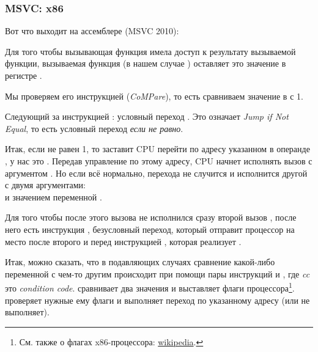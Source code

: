 \subsubsection{MSVC: x86}

Вот что выходит на ассемблере (MSVC 2010):



Для того чтобы вызывающая функция имела доступ к результату вызываемой функции, 
вызываемая функция (в нашем случае \scanf) оставляет это значение в регистре \EAX.

Мы проверяем его инструкцией  (\emph{CoMPare}), то есть сравниваем значение в \EAX с 1.

Следующий за инструкцией \CMP: условный переход \JNE. Это означает \emph{Jump if Not Equal}, то есть условный переход \emph{если не равно}.

Итак, если \EAX не равен 1, то \JNE заставит \ac{CPU} перейти по адресу указанном в операнде \JNE, у нас это .
Передав управление по этому адресу, \ac{CPU} начнет исполнять вызов \printf с аргументом .
Но если всё нормально, перехода не случится и исполнится другой \printf с двумя аргументами:\\
 и значением переменной .

Для того чтобы после этого вызова не исполнился сразу второй вызов \printf, 
после него есть инструкция \JMP, безусловный переход, который отправит процессор на место 
после второго \printf и перед инструкцией , которая реализует .

Итак, можно сказать, что в подавляющих случаях сравнение какой-либо переменной с чем-то другим происходит при помощи пары инструкций \CMP и \Jcc, где \emph{cc} это \emph{condition code}.
\CMP сравнивает два значения и выставляет  флаги процессора\footnote{См. также о флагах x86-процессора: \href{http://go.yurichev.com/17120}{wikipedia}.}.
\Jcc проверяет нужные ему флаги и выполняет переход по указанному адресу (или не выполняет).

